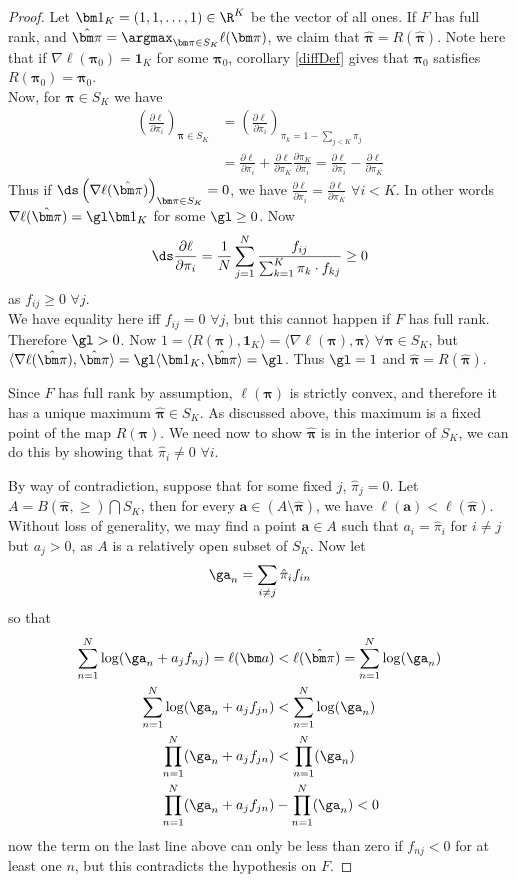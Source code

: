 \begin{proof}
Let $\bm 1_K=(1,1,\ldots,1)\in \R^K$ be the vector of all ones.  If $F$ has full rank, and $\hat{\bm\pi}=\argmax_{\bm\pi\in S_K}\ell(\bm\pi)$, we claim that $\hat{\bm\pi}=R(\hat{\bm\pi})$.
 Note here that if $\nabla\ell(\bm\pi_0)=\bm 1_K$ for some $\bm\pi_0$, corollary \ref{diffDef} gives that $\bm\pi_0$ satisfies $R(\bm\pi_0)=\bm\pi_0$.\\
Now, for $\bm\pi\in S_K$ we have
\begin{align*}
\left(\frac{\partial\ell}{\partial\pi_i}\right)_{\bm\pi\in S_K}&=\left(\frac{\partial\ell}{\partial\pi_i}\right)_{\pi_k=1-\sum_{j<K}\pi_j} \\
&=\frac{\partial\ell}{\partial\pi_i}+\frac{\partial\ell}{\partial\pi_K}\frac{\partial\pi_K}{\partial\pi_i}=\frac{\partial\ell}{\partial\pi_i}-\frac{\partial\ell}{\partial\pi_K}
\end{align*}
Thus if $\ds \left(\nabla\ell(\hat{\bm\pi})\right)_{\bm\pi\in S_K}=0$, we have $\frac{\partial\ell}{\partial\pi_i}=\frac{\partial\ell}{\partial\pi_K}$ $\forall i< K$. In other words $\nabla\ell(\hat{\bm\pi})=\gl\bm 1_K$ for some $\gl\geq 0$. Now \[\ds \frac{\partial\ell}{\partial\pi_i}=\frac 1N\sum_{j=1}^{N}\frac{f_{ij}}{\sum_{k=1}^{K}\pi_k\cdot f_{kj}}\geq 0\] as $f_{ij}\geq 0$ $\forall j$. \\ We have equality here iff $f_{ij}=0$ $\forall j$, but this cannot happen if $F$ has full rank. Therefore $\gl>0$.
Now $1=\langle R(\bm\pi),\bm 1_K\rangle=\langle \nabla\ell(\bm\pi),\bm\pi\rangle$ $\forall \bm\pi\in S_K$, but $\langle \nabla\ell(\hat{\bm\pi}),\hat{\bm\pi}\rangle=\gl\langle \bm 1_K,\hat{\bm\pi}\rangle=\gl$. Thus $\gl=1$ and $\hat{\bm\pi}=R(\hat{\bm\pi})$.

Since $F$ has full rank by assumption, $\ell(\bm\pi)$ is strictly convex, and therefore it has a unique maximum $\hat{\bm\pi}\in S_K$.  As discussed above, this maximum is a fixed point of the map $R(\bm\pi)$. We need now to show $\hat{\bm\pi}$ is in the interior of $S_K$, we can do this by showing that $\hat{\pi}_i\neq 0$ $\forall i$.

By way of contradiction, suppose that for some fixed $j$, $\hat{\pi}_j=0$. Let $A=B(\hat{\bm\pi},\ge)\bigcap S_K$, then for every $\bm a\in (A\setminus\hat{\bm\pi})$, we have $\ell(\bm a)<\ell(\hat{\bm\pi})$.  Without loss of generality, we may find a point $\bm a \in A$ such that $a_i=\hat{\pi}_i$ for $i\neq j$ but $a_j>0$, as $A$ is a relatively open subset of $S_K$.  Now let 
\[\ga_n=\sum_{i\neq j} \hat{\pi}_if_{in}\]
so that 
\begin{align*}
\sum_{n=1}^N\log(\ga_n+a_jf_{nj})=\ell(\bm a)&<\ell(\hat{\bm\pi})=\sum_{n=1}^N\log(\ga_n)\\
\sum_{n=1}^N\log(\ga_n+a_jf_{jn})&<\sum_{n=1}^N\log(\ga_n)\\
\prod_{n=1}^{N}(\ga_n+a_jf_{jn})&<\prod_{n=1}^{N}(\ga_n)\\
\prod_{n=1}^{N}(\ga_n+a_jf_{jn})&-\prod_{n=1}^{N}(\ga_n)<0\\
\end{align*}
now the term on the last line above can only be less than zero if $f_{nj}<0$ for at least one $n$, but this contradicts the hypothesis on $F$.


\end{proof}
